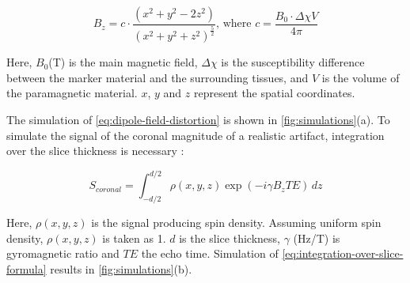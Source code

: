 \documentclass[conference]{IEEEtran}
\begin{document}
\begin{equation}
\label{eq:dipole-field-distortion}
B_z = c \cdot \frac{(x^2 + y^2 - 2z^2)}{(x^2 + y^2 + z^2)^{\frac{5}{2}}}\text{, where } c = \frac{B_0 \cdot \Delta{\chi} V}{4 \pi}
\end{equation}

Here, \(B_0\)(T) is the main magnetic field, \(\Delta{\chi}\) is the susceptibility difference between the marker material and the surrounding tissues, and \(V\) is the volume of the paramagnetic material. \(x\), \(y\) and \(z\) represent the spatial coordinates.

The simulation of \eqref{eq:dipole-field-distortion} is shown in \autoref{fig:simulations}(a). To simulate the signal of the coronal magnitude of a realistic artifact, integration over the slice thickness is necessary \cite{pmid14523965}:

\begin{equation}
\label{eq:integration-over-slice-formula}
S_{coronal} = \int_{-d/2}^{d/2} {\rho}(x,y,z) \exp(-i\gamma B_z TE) \,dz
\end{equation}

Here, \(\rho (x,y,z)\) is the signal producing spin density. Assuming uniform spin density, \(\rho (x,y,z)\) is taken as 1. \(d\) is the slice thickness, \(\gamma\) (Hz/T) is gyromagnetic ratio and \(TE\) the echo time. Simulation of \eqref{eq:integration-over-slice-formula} results in \autoref{fig:simulations}(b).
\end{document}
